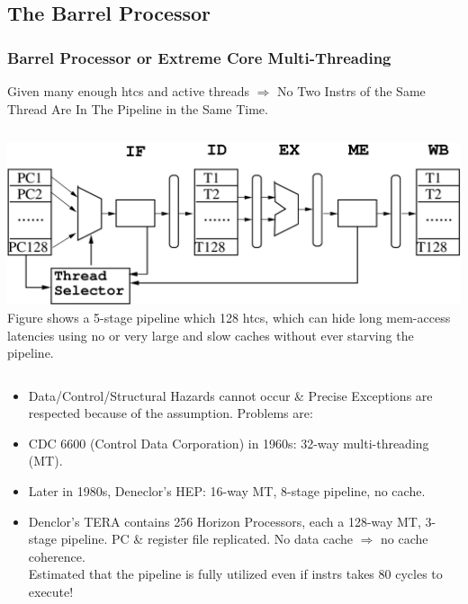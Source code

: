 \documentclass{beamer}
\newcommand{\emp}[1]{\textcolor{DikuRed}{ #1}}
\begin{document}
\subsection{The Barrel Processor}

\begin{frame}[fragile,t]
\frametitle{Barrel Processor or Extreme Core Multi-Threading}

\alert{Given many enough {\sc htc}s and active threads $\Rightarrow$ 
No Two Instrs of the Same Thread Are In The Pipeline in the Same Time.}

\begin{scriptsize}
\begin{columns}
\includegraphics[width=59ex]{Figures/Barrel}\pause
{}
Figure shows a 5-stage pipeline which 128 {\sc htc}s, which can
        hide long mem-access latencies using no or very large 
        and slow caches without ever starving the pipeline.
\end{columns}

\pause

\begin{itemize}
\item Data/Control/Structural Hazards cannot occur \& Precise Exceptions are
        respected because of the \alert{assumption}.  \alert{Problems are}:
    \begin{itemize}\pause
    \end{itemize}
\pause
\item CDC 6600 (Control Data Corporation) in \alert{1960s}: 32-way multi-threading (MT).
\item Later in 1980s, Deneclor's HEP: 16-way MT, 8-stage pipeline,  no cache.
\item Denclor's TERA contains 256 Horizon Processors, each a 128-way MT, 3-stage pipeline. 
        PC \& register file replicated.
        No data cache $\Rightarrow$ no cache coherence.\\\emp{Estimated that the pipeline
        is fully utilized even if instrs takes 80 cycles to execute!}
\end{itemize} 
\end{scriptsize}


\end{frame}
\end{document}
